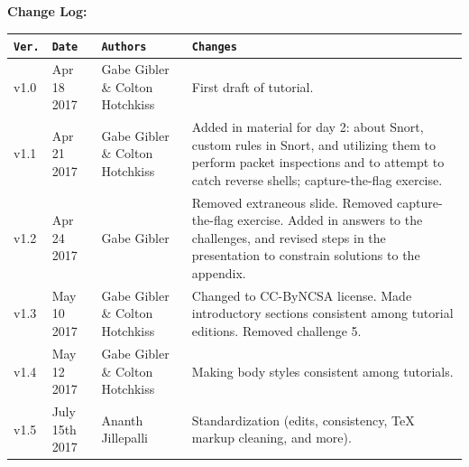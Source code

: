 \documentclass[12pt]{extarticle}
\begin{document}
\newpage
\textbf{Change Log:}
\label{changelog}

\vspace{4mm}
{
\begin{tabular}{ |p{1cm}|p{3cm}|p{4cm}|p{7cm}|  }
	\hline
	\texttt{\textbf{Ver.}} & \texttt{\textbf{Date}} & \texttt{\textbf{Authors}} & \texttt{\textbf{Changes}} \\
	\hline
	v1.0 & Apr 18 2017 & Gabe Gibler \& Colton Hotchkiss & First draft of tutorial. \\
	\hline
	v1.1 & Apr 21 2017 & Gabe Gibler \& Colton Hotchkiss & Added in material for day 2: about Snort, custom rules in Snort, and utilizing them to perform packet inspections and to attempt to catch reverse shells; capture-the-flag exercise. \\
	\hline
	v1.2 & Apr 24 2017 & Gabe Gibler & Removed extraneous slide. Removed capture-the-flag exercise. Added in answers to the challenges, and revised steps in the presentation to constrain solutions to the appendix. \\
	\hline
	v1.3 & May 10 2017 & Gabe Gibler \& Colton Hotchkiss & Changed to CC-ByNCSA license. Made introductory sections consistent among tutorial editions. Removed challenge 5. \\
	\hline
	v1.4 & May 12 2017 & Gabe Gibler \& Colton Hotchkiss & Making body styles consistent among tutorials. \\
	\hline
	v1.5 & July 15th 2017 & Ananth Jillepalli & Standardization (edits, consistency, TeX markup cleaning, and more). \\
	\hline

\end{tabular}
}


	





\pagebreak

	
\end{document}

